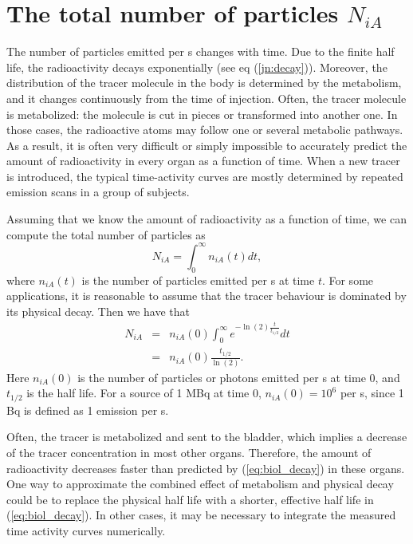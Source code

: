 \section{The total number of particles $N_{iA}$}
The number of particles emitted per s changes with time. Due to the finite
half life, the radioactivity decays exponentially (see eq
(\ref{jn:decay})). Moreover, the distribution of the tracer molecule in the
body is determined by the metabolism, and it changes continuously from the
time of injection. Often, the tracer molecule is metabolized: the molecule is
cut in pieces or transformed into another one. In those cases, the radioactive
atoms may follow one or several metabolic pathways. As a result, it is often
very difficult or simply impossible to accurately predict the amount of
radioactivity in every organ as a function of time. When a new tracer is
introduced, the typical time-activity curves are mostly determined by repeated
emission scans in a group of subjects.

Assuming that we know the amount of radioactivity as a function of time, we
can compute the total number of particles as
\begin{equation}
  N_{iA} =  \int_0^{\infty} n_{iA}(t) dt,
\end{equation}
where $n_{iA}(t)$ is the number of particles emitted per s at time $t$.
For some applications, it is reasonable to assume that the tracer behaviour is
dominated by its physical decay. Then we have that
\begin{eqnarray}
  N_{iA} & = & n_{iA}(0) \int_0^{\infty} e^{- \ln(2) \frac{t}{t_{1/2}}} dt \nonumber\\
         & = & n_{iA}(0) \frac{t_{1/2}}{\ln(2)}. \label{eq:biol_decay}
\end{eqnarray}
Here $n_{iA}(0)$ is the number of particles or photons emitted per s at time
0, and $t_{1/2}$ is the half life.
For a source of 1 MBq at time 0, $n_{iA}(0) = 10^6$ per s, since 1 Bq is
defined as 1 emission per s.

Often, the tracer is metabolized and sent to the bladder, which implies a
decrease of the tracer concentration in most other organs. Therefore,
the amount of radioactivity decreases faster than predicted by
(\ref{eq:biol_decay}) in these organs. One way to approximate the combined
effect of metabolism and physical decay could be to replace the physical
half life with a shorter, effective half life in (\ref{eq:biol_decay}).
In other cases, it may
be necessary to integrate the measured time activity curves numerically.

